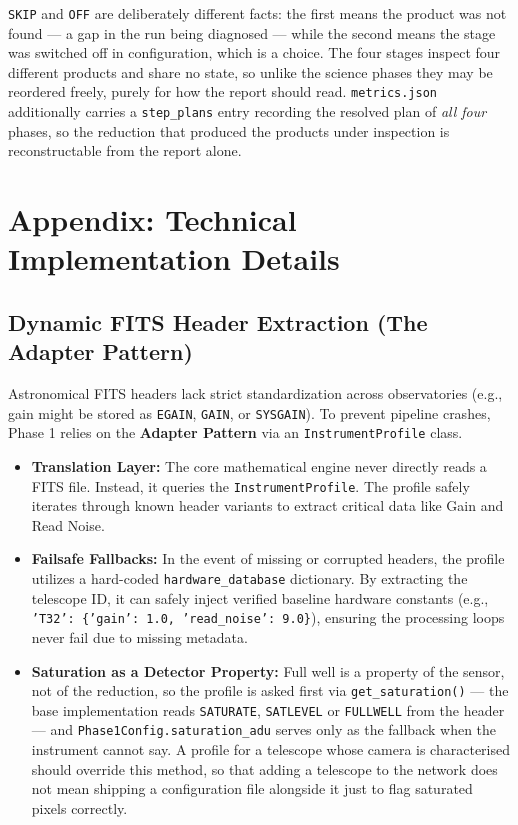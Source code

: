 \documentclass[11pt,a4paper]{article}
\begin{document}
\texttt{SKIP} and \texttt{OFF} are deliberately different facts: the first means
the product was not found --- a gap in the run being diagnosed --- while the
second means the stage was switched off in configuration, which is a choice. The
four stages inspect four different products and share no state, so unlike the
science phases they may be reordered freely, purely for how the report should
read. \texttt{metrics.json} additionally carries a \texttt{step\_plans} entry
recording the resolved plan of \emph{all four} phases, so the reduction that
produced the products under inspection is reconstructable from the report alone.

\newpage

\section{Appendix: Technical Implementation Details}

\subsection{Dynamic FITS Header Extraction (The Adapter Pattern)}\label{app:adapter}
Astronomical FITS headers lack strict standardization across observatories (e.g., gain might be stored as \texttt{EGAIN}, \texttt{GAIN}, or \texttt{SYSGAIN}). To prevent pipeline crashes, Phase 1 relies on the \textbf{Adapter Pattern} via an \texttt{InstrumentProfile} class.
\begin{itemize}[leftmargin=*]
    \item \textbf{Translation Layer:} The core mathematical engine never directly reads a FITS file. Instead, it queries the \texttt{InstrumentProfile}. The profile safely iterates through known header variants to extract critical data like Gain and Read Noise.
    \item \textbf{Failsafe Fallbacks:} In the event of missing or corrupted headers, the profile utilizes a hard-coded \texttt{hardware\_database} dictionary. By extracting the telescope ID, it can safely inject verified baseline hardware constants (e.g., \texttt{'T32': \{'gain': 1.0, 'read\_noise': 9.0\}}), ensuring the processing loops never fail due to missing metadata.
    \item \textbf{Saturation as a Detector Property:} Full well is a property of the sensor, not of the reduction, so the profile is asked first via \texttt{get\_saturation()} --- the base implementation reads \texttt{SATURATE}, \texttt{SATLEVEL} or \texttt{FULLWELL} from the header --- and \texttt{Phase1Config.saturation\_adu} serves only as the fallback when the instrument cannot say. A profile for a telescope whose camera is characterised should override this method, so that adding a telescope to the network does not mean shipping a configuration file alongside it just to flag saturated pixels correctly.
\end{itemize}
\end{document}
